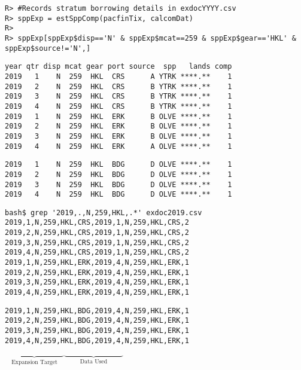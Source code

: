 \documentclass[ xcolor = pdftex, dvipsnames, table ]{beamer}
\begin{document}
%
\begin{frame}[fragile]
\begin{minipage}[h!]{0.44\textwidth}
\end{minipage}
\begin{minipage}[h!]{0.54\textwidth}
{\tiny
\begin{verbatim}
R> #Records stratum borrowing details in exdocYYYY.csv 
R> sppExp = estSppComp(pacfinTix, calcomDat)
R>
R> sppExp[sppExp$disp=='N' & sppExp$mcat==259 & sppExp$gear=='HKL' & sppExp$source!='N',]
\end{verbatim}
}
{\scriptsize
\begin{verbatim}
year qtr disp mcat gear port source  spp   lands comp
2019   1    N  259  HKL  CRS      A YTRK ****.**    1
2019   2    N  259  HKL  CRS      B YTRK ****.**    1
2019   3    N  259  HKL  CRS      B YTRK ****.**    1
2019   4    N  259  HKL  CRS      B YTRK ****.**    1
2019   1    N  259  HKL  ERK      B OLVE ****.**    1
2019   2    N  259  HKL  ERK      B OLVE ****.**    1
2019   3    N  259  HKL  ERK      B OLVE ****.**    1
2019   4    N  259  HKL  ERK      A OLVE ****.**    1
\end{verbatim}
\vspace*{-0.65cm}
{\color{red}
\begin{verbatim}
2019   1    N  259  HKL  BDG      D OLVE ****.**    1 
2019   2    N  259  HKL  BDG      D OLVE ****.**    1
2019   3    N  259  HKL  BDG      D OLVE ****.**    1
2019   4    N  259  HKL  BDG      D OLVE ****.**    1
\end{verbatim}
}
}
\end{minipage}
\end{frame}

%
\begin{frame}[fragile]
\begin{verbatim}
bash$ grep '2019,.,N,259,HKL,.*' exdoc2019.csv 
2019,1,N,259,HKL,CRS,2019,1,N,259,HKL,CRS,2
2019,2,N,259,HKL,CRS,2019,1,N,259,HKL,CRS,2
2019,3,N,259,HKL,CRS,2019,1,N,259,HKL,CRS,2
2019,4,N,259,HKL,CRS,2019,1,N,259,HKL,CRS,2
2019,1,N,259,HKL,ERK,2019,4,N,259,HKL,ERK,1
2019,2,N,259,HKL,ERK,2019,4,N,259,HKL,ERK,1
2019,3,N,259,HKL,ERK,2019,4,N,259,HKL,ERK,1
2019,4,N,259,HKL,ERK,2019,4,N,259,HKL,ERK,1
\end{verbatim}
\vspace*{-0.9cm}
{\color{red}
\begin{verbatim}
2019,1,N,259,HKL,BDG,2019,4,N,259,HKL,ERK,1
2019,2,N,259,HKL,BDG,2019,4,N,259,HKL,ERK,1
2019,3,N,259,HKL,BDG,2019,4,N,259,HKL,ERK,1
2019,4,N,259,HKL,BDG,2019,4,N,259,HKL,ERK,1
\end{verbatim}
}
\vspace*{-0.9cm}
$\underbrace{~~~~~~~~~~~~~~~~~~~~~~~~~~~~~~~~}_{\text{Expansion Target}}\underbrace{~~~~~~~~~~~~~~~~~~~~~~~~~~~~~~~~}_{\text{Data Used}}$
\end{frame}
\end{document}
